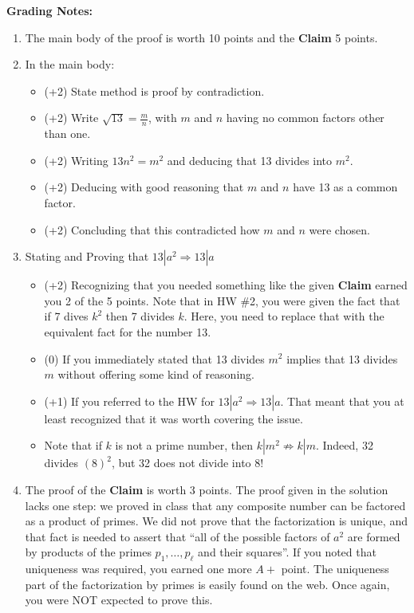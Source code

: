 \documentclass[letterpaper]{article}
\begin{document}
\textbf{Grading Notes:}
\begin{enumerate}
\setlength{\itemsep}{.15in}
\renewcommand{\labelenumi}{(\alph{enumi})}
\setlength{\itemsep}{.1in}
\item The main body of the proof is worth 10 points and the \textbf{Claim} 5 points.

\item In the main body:
\begin{itemize}
\item  (+2) State method is proof by contradiction.
\item  (+2) Write $\sqrt{13}=\frac{m}{n}$, with $m$ and $n$ having no common factors other than one.
\item (+2) Writing $13 n^2 = m^2$ and deducing that 13 divides into $m^2$.
\item (+2) Deducing with good reasoning that $m$ and $n$ have 13 as a common factor.
\item (+2) Concluding that this contradicted how $m$ and $n$ were chosen.
\end{itemize}

\item Stating and Proving that $13|a^2 \Rightarrow 13|a$
\begin{itemize}
\item  (+2) Recognizing that you needed something like the given \textbf{Claim}  earned you 2 of the 5 points. Note that in HW \#2, you were given the fact that if 7 dives $k^2$ then 7 divides $k$. Here, you need to replace that with the equivalent fact for the number 13.

\item (0) If you immediately stated that 13 divides $m^2$ implies that 13 divides $m$ without offering some kind of reasoning.

\item (+1) If you referred to the HW for $13|a^2 \Rightarrow 13|a$. That meant that you at least recognized that it was worth covering the issue.

 \item Note that if $k$ is not a prime number, then $k|m^2 \not \Rightarrow k|m$. Indeed, 32 divides $(8)^2$, but 32 does not divide into 8!

 \end{itemize}

\item The proof of the \textbf{Claim} is worth 3 points. The proof given in the solution lacks one step: we proved in class that any composite number can be factored as a product of primes. We did not prove that the factorization is unique, and that fact is needed to assert that ``all of the possible factors of $a^2$ are formed by products of the primes $p_1, \ldots, p_\ell$ and their squares''. If you noted that uniqueness was required, you earned one more $A+$ point. The uniqueness part of the factorization by primes is easily found on the web. Once again, you were NOT expected to prove this.


\end{enumerate}
\end{document}
